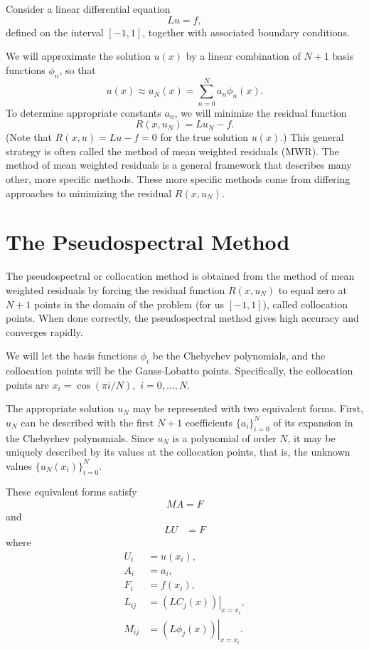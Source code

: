 \label{lab:pseudospectral1_revision}

Consider a linear differential equation 
\[Lu = f, \]
defined on the interval $[-1,1]$, together with associated boundary conditions. 

We will approximate the solution $u(x)$ by a linear combination of $N+1$ basis functions $\phi_n$, so that 
\[
u(x) \approx u_N(x) = \sum_{n=0}^N a_n \phi_n(x). 
\]
To determine appropriate constants $a_n$, we will minimize the residual function 
\[
R(x,u_N) = Lu_N - f.
\]
(Note that $R(x,u) = Lu - f = 0$ for the true solution $u(x)$.) 
This general strategy is often called the method of mean weighted residuals (MWR). The method of mean weighted residuals is a general framework that describes many other, more specific methods. These more specific methods come from differing approaches to minimizing the residual $R(x,u_N)$.


\section*{The Pseudospectral Method}
The pseudospectral or collocation method is obtained from the method of mean weighted residuals by forcing the residual function $R(x,u_N)$ to equal zero at $N+1$ points in the domain of the problem (for us $[-1,1]$), called collocation points. 
When done correctly, the pseudospectral method gives high accuracy and converges rapidly. 

We will let the basis functions $\phi_i$ be the Chebychev polynomials, and the collocation points will be the Gauss-Lobatto points. 
Specifically, the collocation points are $x_i = \cos(\pi i /N),$ $ i = 0, \ldots, N$.


The appropriate solution $u_N$ may be represented with two equivalent forms. 
First, $u_N$ can be described with the first $N+1$ coefficients  $\{a_i\}_{i=0}^N$ of its expansion in the Chebychev polynomials. 
Since $u_N$ is a polynomial of order $N$, it may be uniquely described by its values at the collocation points, that is, the unknown values  $\{u_N(x_i)\}_{i=0}^N$.

These equivalent forms satisfy
\begin{align}
	MA = F \label{spectral1b:chebychev_expansion}
\end{align}
and
\begin{align}
	LU &= F \label{spectral1b:grid_point}
\end{align}
where 
\begin{align*}
	U_i &= u(x_i),\\
	A_i &= a_i,\\
	F_i &= f(x_i),\\
	L_{ij} &= \left.(LC_j(x))\right|_{x=x_i},\\
	M_{ij} &= \left.(L\phi_j(x))\right|_{x=x_i}. 
\end{align*}

